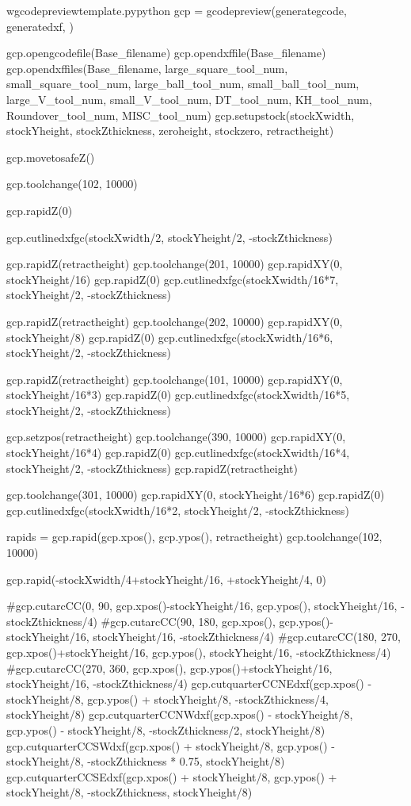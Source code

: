 \documentclass{ltxdoc}
\begin{document}
\begin{writecode}{w}{gcodepreviewtemplate.py}{python}
gcp = gcodepreview(generategcode,
                   generatedxf,
                   )

gcp.opengcodefile(Base_filename)
gcp.opendxffile(Base_filename)
gcp.opendxffiles(Base_filename,
                 large_square_tool_num,
                 small_square_tool_num,
                 large_ball_tool_num,
                 small_ball_tool_num,
                 large_V_tool_num,
                 small_V_tool_num,
                 DT_tool_num,
                 KH_tool_num,
                 Roundover_tool_num,
                 MISC_tool_num)
gcp.setupstock(stockXwidth, stockYheight, stockZthickness, zeroheight, stockzero, retractheight)

gcp.movetosafeZ()

gcp.toolchange(102, 10000)

gcp.rapidZ(0)

gcp.cutlinedxfgc(stockXwidth/2, stockYheight/2, -stockZthickness)

gcp.rapidZ(retractheight)
gcp.toolchange(201, 10000)
gcp.rapidXY(0, stockYheight/16)
gcp.rapidZ(0)
gcp.cutlinedxfgc(stockXwidth/16*7, stockYheight/2, -stockZthickness)

gcp.rapidZ(retractheight)
gcp.toolchange(202, 10000)
gcp.rapidXY(0, stockYheight/8)
gcp.rapidZ(0)
gcp.cutlinedxfgc(stockXwidth/16*6, stockYheight/2, -stockZthickness)

gcp.rapidZ(retractheight)
gcp.toolchange(101, 10000)
gcp.rapidXY(0, stockYheight/16*3)
gcp.rapidZ(0)
gcp.cutlinedxfgc(stockXwidth/16*5, stockYheight/2, -stockZthickness)

gcp.setzpos(retractheight)
gcp.toolchange(390, 10000)
gcp.rapidXY(0, stockYheight/16*4)
gcp.rapidZ(0)
gcp.cutlinedxfgc(stockXwidth/16*4, stockYheight/2, -stockZthickness)
gcp.rapidZ(retractheight)

gcp.toolchange(301, 10000)
gcp.rapidXY(0, stockYheight/16*6)
gcp.rapidZ(0)
gcp.cutlinedxfgc(stockXwidth/16*2, stockYheight/2, -stockZthickness)

rapids = gcp.rapid(gcp.xpos(), gcp.ypos(), retractheight)
gcp.toolchange(102, 10000)

gcp.rapid(-stockXwidth/4+stockYheight/16, +stockYheight/4, 0)

#gcp.cutarcCC(0, 90, gcp.xpos()-stockYheight/16, gcp.ypos(), stockYheight/16, -stockZthickness/4)
#gcp.cutarcCC(90, 180, gcp.xpos(), gcp.ypos()-stockYheight/16, stockYheight/16, -stockZthickness/4)
#gcp.cutarcCC(180, 270, gcp.xpos()+stockYheight/16, gcp.ypos(), stockYheight/16, -stockZthickness/4)
#gcp.cutarcCC(270, 360, gcp.xpos(), gcp.ypos()+stockYheight/16, stockYheight/16, -stockZthickness/4)
gcp.cutquarterCCNEdxf(gcp.xpos() - stockYheight/8, gcp.ypos() + stockYheight/8, -stockZthickness/4, stockYheight/8)
gcp.cutquarterCCNWdxf(gcp.xpos() - stockYheight/8, gcp.ypos() - stockYheight/8, -stockZthickness/2, stockYheight/8)
gcp.cutquarterCCSWdxf(gcp.xpos() + stockYheight/8, gcp.ypos() - stockYheight/8, -stockZthickness * 0.75, stockYheight/8)
gcp.cutquarterCCSEdxf(gcp.xpos() + stockYheight/8, gcp.ypos() + stockYheight/8, -stockZthickness, stockYheight/8)


\end{writecode}
\end{document}
